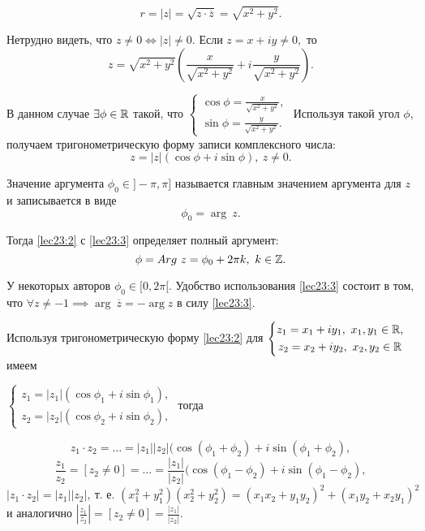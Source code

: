 \documentclass[../../main.tex]{subfiles}
\begin{document}
	\[r = |z| = \sqrt{z\cdot \overline{z}} = \sqrt{x^2+y^2}.\]
	
	Нетрудно видеть, что $z \neq 0 \Leftrightarrow |z| \neq 0.$ Если
	 $z = x+iy \neq 0,$ то \[z = \sqrt{x^2+y^2}\left(\frac{x}{\sqrt{x^2+y^2}}
	 + i\frac{y}{\sqrt{x^2+y^2}}\right). \] 
	
	В данном случае $\exists \phi\in\mathbb{R}$ такой, что $\left\{
	\begin{gathered} 
	\cos \phi = \frac{x}{\sqrt{x^2+y^2}},\\
	\sin \phi = \frac{y}{\sqrt{x^2+y^2}}.
	\end{gathered}\right.$ Используя такой угол $\phi$, получаем
	тригонометрическую форму записи комплексного числа:
	\begin{equation}\label{lec23:2}
	z = |z|(\cos \phi + i \sin\phi),\ z\neq 0.
	\end{equation} 
	
	Значение аргумента ${\phi}_0 \in ]-\pi, \pi]$ называется главным
	значением аргумента для $z$ и записывается в виде
	\begin{equation}
	\label{lec23:3}
	{\phi}_0 = \arg\ z.
	\end{equation}
	
	Тогда \eqref{lec23:2} с \eqref{lec23:3} определяет полный аргумент:
	\[ \phi = Arg\ z = {\phi}_0+2\pi k,\ k\in\mathbb{Z}. \]
	
	У некоторых авторов ${\phi}_0\in[0, 2\pi[.$ Удобство использования
	\eqref{lec23:3} состоит в том, что $\forall z \neq -1 \implies \arg\
	\overline{z} = - \arg z$ в силу  \eqref{lec23:3}.
	
	Используя тригонометрическую форму  \eqref{lec23:2} для  $\left\{
	\begin{gathered} 
	z_1 =  x_1+iy_1,\ x_1, y_1\in \mathbb{R},\\
	z_2 =  x_2+iy_2,\ x_2, y_2\in \mathbb{R}
	\end{gathered}\right.$ имеем 
	
	$\left\{
	\begin{gathered} 
	z_1 = |z_1|(\cos {\phi}_1 + i\sin {\phi}_1),\\
	z_2 =  |z_2|(\cos {\phi}_2 + i\sin {\phi}_2),
	\end{gathered}\right.$ тогда
	
	\[z_1\cdot z_2 = \ldots = |z_1| |z_2|(\cos({\phi}_1+{\phi}_2)+
	i\sin({\phi}_1+{\phi}_2),\]
	\[\frac{z_1}{z_2} =[z_2 \neq 0] = \ldots =\frac{ |z_1|}{ |z_2|}
	(\cos({\phi}_1-{\phi}_2)+i\sin({\phi}_1-{\phi}_2),\]
	\[ |z_1\cdot z_2| = |z_1||z_2|,\ \text{т.~е. } (x_1^2+y_1^2)(x_2^2+y_2^2)
	 = (x_1x_2 + y_1y_2)^2 + (x_1y_2+x_2y_1)^2 \]
	и аналогично $|\frac{z_1}{z_2}| = [z_2 \neq 0] = \frac{|z_1|}{|z_2|}.$
	
\end{document}
